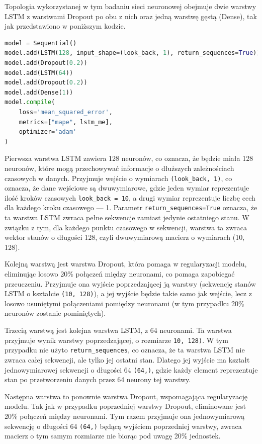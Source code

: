 \documentclass[polish, twoside, 12pt, a4paper]{article}
\theoremstyle{definition}
\theoremstyle{plain}
\theoremstyle{remark}
\newcommand{\code}[1]{\lstinline{#1}}
\begin{document}
Topologia wykorzystanej w tym badaniu sieci neuronowej obejmuje dwie warstwy LSTM z warstwami Dropout po obu z nich oraz jedną warstwę gęstą (Dense), tak jak przedstawiono w poniższym kodzie.
\begin{lstlisting}[language=Python, numbers=none]
model = Sequential()
model.add(LSTM(128, input_shape=(look_back, 1), return_sequences=True))
model.add(Dropout(0.2))
model.add(LSTM(64))
model.add(Dropout(0.2))
model.add(Dense(1))
model.compile(
    loss='mean_squared_error', 
    metrics=["mape", lstm_me], 
    optimizer='adam'
)
\end{lstlisting}	
Pierwsza warstwa LSTM zawiera 128 neuronów, co oznacza, że będzie miała 128 neuronów, które mogą przechowywać informacje o dłuższych zależnościach czasowych w danych. Przyjmuje wejście o wymiarach \code{(look_back, 1)}, co oznacza, że dane wejściowe są dwuwymiarowe, gdzie jeden wymiar reprezentuje ilość kroków czasowych \code{look_back = 10}, a drugi wymiar reprezentuje liczbę cech dla każdego kroku czasowego --- 1. Parametr \code{return_sequences=True} oznacza, że ta warstwa LSTM zwraca pełne sekwencje zamiast jedynie ostatniego stanu. W związku z tym, dla każdego punktu czasowego w sekwencji, warstwa ta zwraca wektor stanów o długości 128, czyli dwuwymiarową macierz o wymiarach (10, 128). 

Kolejną warstwą jest warstwa Dropout, która pomaga w regularyzacji modelu, eliminując losowo 20\% połączeń między neuronami, co pomaga zapobiegać przeuczeniu. Przyjmuje ona wyjście poprzedzającej ją warstwy (sekwencję stanów LSTM o kształcie \code{(10, 128)}), a jej wyjście będzie takie samo jak wejście, lecz z losowo usuniętymi połączeniami pomiędzy neuronami (w tym przypadku 20\% neuronów zostanie pominiętych). 

Trzecią warstwą jest kolejna warstwa LSTM, z 64 neuronami. Ta warstwa przyjmuje wynik warstwy poprzedzającej, o rozmiarze \code{10, 128)}. W tym przypadku nie użyto \code{return_sequences}, co oznacza, że ta warstwa LSTM nie zwraca całej sekwencji, ale tylko jej ostatni stan. Dlatego jej wyjście ma kształt jednowymiarowej sekwencji o długości 64 \code{(64,)}, gdzie każdy element reprezentuje stan po przetworzeniu danych przez 64 neurony tej warstwy. 

Następna warstwa to ponownie warstwa Dropout, wspomagająca regularyzację modelu. Tak jak w przypadku poprzedniej warstwy Dropout, eliminowane jest 20\% połączeń między neuronami. Tym razem przyjmuje ona jednowymiarową sekwencję o długości 64 \code{(64,)} będącą wyjściem poprzedniej warstwy, zwraca macierz o tym samym rozmiarze nie biorąc pod uwagę 20\% jednostek.
\end{document}
